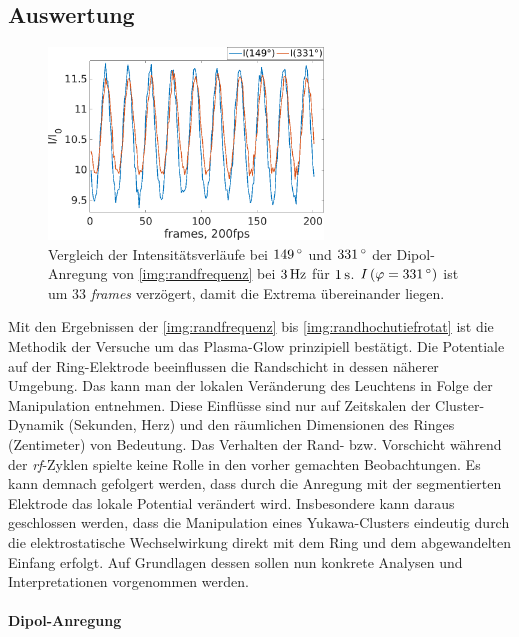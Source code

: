 \documentclass[numbers=noenddot,a4paper,notitlepage,twoside,BCOR15mm]{scrbook}
\newcommand{\degree}{^\circ}
\newcommand{\tilt}[1]{\textit{#1}}
\begin{document}
			\subsection{Auswertung}

					\begin{figure}[!b]
						\centering
						\hspace{-0.7cm}\includegraphics[width=0.65\textwidth,height=0.4\textwidth]{figs/auswertung/plasmaglw/intensdipol181u3313Hz1sek.png}
						\caption{Vergleich der Intensitätsverläufe bei $\unit[149]{\degree}$  und $\unit[331]{\degree}$ der Dipol-Anregung von \autoref{img:randfrequenz} bei $\unit[3]{Hz}$ für $\unit[1]{s}$. $I\left(\varphi=\unit[331]{\degree}\right)$ ist um 33 \tilt{frames} verzögert, damit die Extrema übereinander liegen.}
						\label{img:intensdipol}
					\end{figure}

				Mit den Ergebnissen der \autoref{img:randfrequenz} bis \autoref{img:randhochutiefrotat} ist die Methodik der Versuche um das Plasma-Glow prinzipiell bestätigt. Die Potentiale auf der Ring-Elektrode beeinflussen die Randschicht in dessen näherer Umgebung. Das kann man der lokalen Veränderung des Leuchtens in Folge der Manipulation entnehmen. Diese Einflüsse sind nur auf Zeitskalen der Cluster-Dynamik (Sekunden, Herz) und den räumlichen Dimensionen des Ringes (Zentimeter) von Bedeutung. Das Verhalten der Rand- bzw. Vorschicht während der \tilt{rf}-Zyklen spielte keine Rolle in den vorher gemachten Beobachtungen. Es kann demnach gefolgert werden, dass durch die Anregung mit der segmentierten Elektrode das lokale Potential verändert wird. Insbesondere kann daraus geschlossen werden, dass die Manipulation eines Yukawa-Clusters eindeutig durch die elektrostatische Wechselwirkung direkt mit dem Ring und dem abgewandelten Einfang erfolgt. Auf Grundlagen dessen sollen nun konkrete Analysen und Interpretationen vorgenommen werden.

				\paragraph{Dipol-Anregung}
\end{document}
